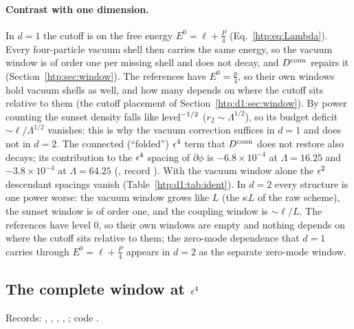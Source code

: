 \paragraph{Contrast with one dimension.} In $d=1$ the cutoff is on the free energy $E^0=\ell+\frac P4$
(Eq.~\eqref{htp:eq:Lambda}). Every four-particle vacuum shell then carries the same energy, so the vacuum window is of order one
per missing shell and does not decay, and $D^{\rm conn}$ repairs it (Section~\ref{htp:sec:window}). The references have
$E^0=\frac p4$, so their own windows hold vacuum shells as well, and how many depends on where the cutoff sits relative to
them (the cutoff placement of Section~\ref{htp:d1:sec:window}). By power counting the sunset density falls like
${\rm level}^{-1/2}$ ($r_2\sim\Lambda^{1/2}$), so its budget deficit ${\sim}\ell/\Lambda^{1/2}$ vanishes: this is why the
vacuum correction suffices in $d=1$ and does not in $d=2$. The connected (``folded'') $\epsilon^4$ term that $D^{\rm conn}$ does
not restore also decays; its contribution to the $\epsilon^4$ spacing of $\partial\phi$ is $-6.8\times10^{-4}$ at
$\Lambda=16.25$ and $-3.8\times10^{-4}$ at $\Lambda=64.25$ (, record
). With the
vacuum window alone the $\epsilon^2$ descendant spacings vanish (Table~\ref{htp:d1:tab:ident}). In $d=2$ every structure is one
power worse: the vacuum window grows like $L$ (the $\kappa L$ of the raw scheme), the sunset window is of order one, and the
coupling window is ${\sim}\ell/L$. The references have level 0, so their own windows are empty and nothing depends on where
the cutoff sits relative to them; the zero-mode dependence that $d=1$ carries through $E^0=\ell+\frac P4$ appears in $d=2$
as the separate zero-mode window.

\subsection{The complete window at \texorpdfstring{$\epsilon^4$}{eps4}}\label{htp:d2:app:window}
{\small\raggedright\noindent Records: , ,
, ,
; code .\par}

